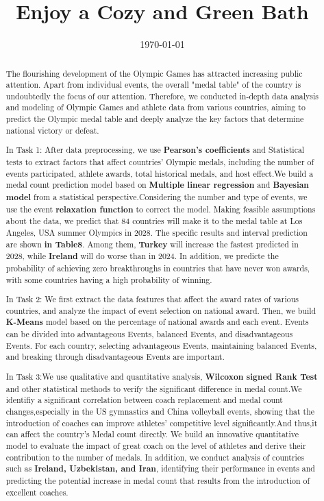 \documentclass{mcmthesis}
\title{Enjoy a Cozy and Green Bath}
\date{\today}
\begin{document}
\begin{abstract}

The flourishing development of the Olympic Games has attracted increasing public attention. Apart from individual events, the overall "medal table" of the country is undoubtedly the focus of our attention. Therefore, we conducted in-depth data analysis and modeling of Olympic Games and athlete data from various countries, aiming to predict the Olympic medal table and deeply analyze the key factors that determine national victory or defeat.

In Task 1: After data preprocessing, we use \textbf{Pearson's coefficients} and Statistical tests to extract factors that affect countries' Olympic medals, including the number of events participated, athlete awards, total historical medals, and host effect.We build a medal count prediction model based on \textbf{Multiple linear regression} and \textbf{Bayesian model} from a statistical perspective.Considering the number and type of events, we use the event \textbf{relaxation function} to correct the model. Making feasible assumptions about the data, we predict that 84 countries will make it to the medal table at Los Angeles, USA summer Olympics in 2028. The specific results and interval prediction are shown \textbf{in Table8}. Among them, \textbf{Turkey} will increase the fastest predicted in 2028, while \textbf{Ireland} will do worse than in 2024. In addition, we predicte the probability of achieving zero breakthroughs in countries that have never won awards, with some countries having a high probability of winning.

In Task 2: We first extract the data features that affect the award rates of various countries, and analyze the impact of event selection on national award. Then, we build \textbf{K-Means} model based on the percentage of national awards and each event. Events can be divided into advantageous Events, balanced Events, and disadvantageous Events. For each country, selecting advantageous Events, maintaining balanced Events, and breaking through disadvantageous Events are important.

In Task 3:We use qualitative and quantitative analysis, \textbf{Wilcoxon signed Rank Test} and other statistical methods to verify the significant difference in medal count.We identifiy a significant correlation between coach replacement and medal count changes,especially in the US gymnastics and China volleyball events, showing that the introduction of coaches can improve athletes' competitive level significantly.And thus,it can affect the country's Medal count directly. We build an innovative quantitative model to evaluate the impact of great coach on the level of athletes and derive their contribution to the number of medals. In addition, we conduct analysis of countries such as \textbf{Ireland, Uzbekistan, and Iran}, identifying their performance in events and predicting the potential increase in medal count that results from the introduction of excellent coaches.


\end{abstract}
\end{document}

